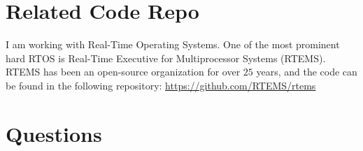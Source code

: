\section{Related Code Repo}

I am working with Real-Time Operating Systems. One of the most prominent hard RTOS is Real-Time Executive for Multiprocessor Systems (RTEMS). RTEMS has been an open-source organization for over $25$ years, and the code can be found in the following repository:
\url{https://github.com/RTEMS/rtems}



\section{Questions}

